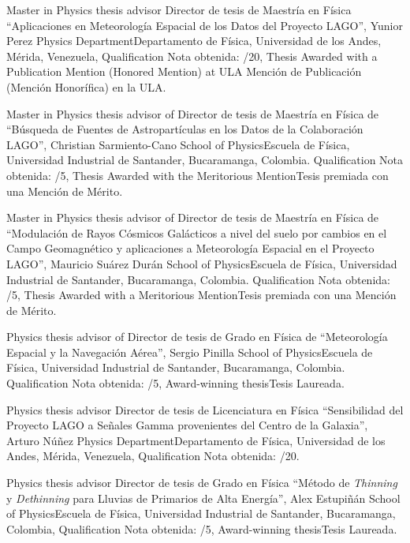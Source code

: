 \ifeng
Master in Physics thesis advisor
 \else
Director de tesis de Maestría en Física
 \fi
 ``Aplicaciones en Meteorología Espacial de los Datos del Proyecto LAGO'', Yunior Perez \at \ifeng Physics Department\else Departamento de Física\fi, Universidad de los Andes, Mérida, Venezuela, \ifeng Qualification \else Nota obtenida: /20, \ifeng Thesis Awarded with a Publication Mention (Honored Mention) at ULA \else Mención de Publicación (Mención Honorífica) en la ULA\fi.

\ifeng
Master in Physics thesis advisor of
 \else
Director de tesis de Maestría en Física de
 \fi
``Búsqueda de Fuentes de Astropartículas en los Datos de la Colaboración LAGO'', Christian Sarmiento-Cano \at \ifeng School of Physics\else Escuela de Física\fi, Universidad Industrial de Santander, Bucaramanga, Colombia. \ifeng Qualification \else Nota obtenida: /5, \ifeng Thesis Awarded with the Meritorious Mention\else Tesis premiada con una Mención de Mérito\fi.

\ifeng
Master in Physics thesis advisor of
 \else
Director de tesis de Maestría en Física de
 \fi
``Modulación de Rayos Cósmicos Galácticos a nivel del suelo por cambios en el Campo Geomagnético y aplicaciones a Meteorología Espacial en el Proyecto LAGO'', Mauricio Suárez Durán \at \ifeng School of Physics\else Escuela de Física\fi, Universidad Industrial de Santander, Bucaramanga, Colombia. \ifeng Qualification \else Nota obtenida: /5, \ifeng Thesis Awarded with a Meritorious Mention\else Tesis premiada con una Mención de Mérito\fi.

\ifeng
Physics thesis advisor of
 \else
Director de tesis de Grado en Física de
 \fi
``Meteorología Espacial y la Navegación Aérea'', Sergio Pinilla \at \ifeng School of Physics\else Escuela de Física\fi, Universidad Industrial de Santander, Bucaramanga, Colombia.  \ifeng Qualification \else Nota obtenida: /5, \ifeng Award-winning thesis\else Tesis Laureada\fi.

\ifeng
Physics thesis advisor
 \else
Director de tesis de Licenciatura en Física
 \fi
``Sensibilidad del Proyecto LAGO a Señales Gamma provenientes del Centro de la Galaxia'', Arturo Núñez \at \ifeng Physics Department\else Departamento de Física\fi, Universidad de los Andes, Mérida, Venezuela, \ifeng Qualification \else Nota obtenida: /20.

\ifeng
Physics thesis advisor
 \else
Director de tesis de Grado en Física
 \fi
``Método de {\textit{Thinning}} y {\textit{Dethinning}} para Lluvias de Primarios de Alta Energía'', Alex Estupiñán \at \ifeng School of Physics\else Escuela de Física\fi, Universidad Industrial de Santander, Bucaramanga, Colombia, \ifeng Qualification \else Nota obtenida: /5, \ifeng Award-winning thesis\else Tesis Laureada\fi.

